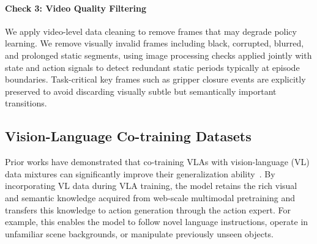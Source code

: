\paragraph{Check 3: Video Quality Filtering}
We apply video-level data cleaning to remove frames that may degrade policy learning. We remove visually invalid frames including black, corrupted, blurred, and prolonged static segments, using image processing checks applied jointly with state and action signals to detect redundant static periods typically at episode boundaries. Task-critical key frames such as gripper closure events are explicitly preserved to avoid discarding visually subtle but semantically important transitions.



   





\subsection{Vision-Language Co-training Datasets}
\label{sec:vlm_data}

Prior works have demonstrated that co-training VLAs with vision-language (VL) data mixtures can significantly improve their generalization ability~\citep{pi05, driess2025knowledge, fang2026molmoact2}. By incorporating VL data during VLA training, the model retains the rich visual and semantic knowledge acquired from web-scale multimodal pretraining and transfers this knowledge to action generation through the action expert. For example, this enables the model to follow novel language instructions, operate in unfamiliar scene backgrounds, or manipulate previously unseen objects.

